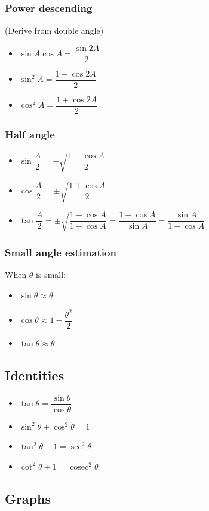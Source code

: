 \documentclass[A4paper]{article}
\DeclareMathOperator\cosec{cosec}
\begin{document}
	\subsubsection{Power descending}
	(Derive from double angle)
	\begin{itemize}
		\item $\sin A \cos A = \dfrac{\sin2A}{2}$
		\item $\sin^2 A = \dfrac{1-\cos2A}{2}$
		\item $\cos^2 A = \dfrac{1+\cos2A}{2}$
	\end{itemize}
	\subsubsection{Half angle}
	\begin{itemize}
		\item $\sin \dfrac{A}{2} = \pm \sqrt{\dfrac{1-\cos A}{2}}$
		\item $\cos \dfrac{A}{2} = \pm \sqrt{\dfrac{1+\cos A}{2}}$
		\item $\tan \dfrac{A}{2} = \pm \sqrt{\dfrac{1-\cos A}{1+\cos A}} = \dfrac{1-\cos A}{\sin A} = \dfrac{\sin A}{1+\cos A}$
	\end{itemize}
	\subsubsection{Small angle estimation}
	When $\theta$ is small:
	\begin{itemize}
		\item $\sin \theta \approx \theta$
		\item $\cos \theta \approx 1- \dfrac{\theta^2}{2}$
		\item $\tan \theta \approx \theta$
	\end{itemize}
	\subsection{Identities}
	\begin{itemize}
		\item $\tan \theta = \dfrac{\sin \theta}{\cos \theta}$
		\item $\sin^2 \theta + \cos^2 \theta = 1$
		\item $\tan^2 \theta + 1 = \sec^2 \theta$
		\item $\cot^2 \theta + 1 = \cosec^2 \theta$
	\end{itemize}

	\subsection{Graphs}
\end{document}

